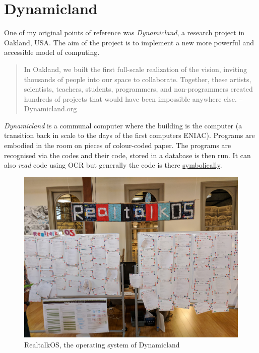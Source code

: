 \documentclass[12pt]{report}
\begin{document}
\section{Dynamicland}
\label{sec:org977886d}

One of my original points of reference was \emph{Dynamicland}, a research project in
Oakland, USA. The aim of the project is to implement a new more powerful and
accessible model of computing.

\begin{quote}


In Oakland, we built the first full-scale realization of the vision, inviting
thousands of people into our space to collaborate. Together, these artists,
scientists, teachers, students, programmers, and non-programmers created
hundreds of projects that would have been impossible anywhere else.
-- Dynamicland.org
\end{quote}

\emph{Dynamicland} is a communal computer where the building is the computer (a
transition back in scale to the days of the first computers ENIAC). Programs are
embodied in the room on pieces of colour-coded paper. The programs are
recognised via the codes and their code, stored in a database is then run. It
can also \emph{read} code using OCR but generally the code is there \href{https://thenewstack.io/dynamicland-rethinks-computer-interfaces/}{symbolically}. 

\begin{figure}[htbp]
\centering
\includegraphics[width=.9\linewidth]{assets/realtalk-os.jpg}
\caption{RealtalkOS, the operating system of Dynamicland}
\end{figure}
\end{document}
